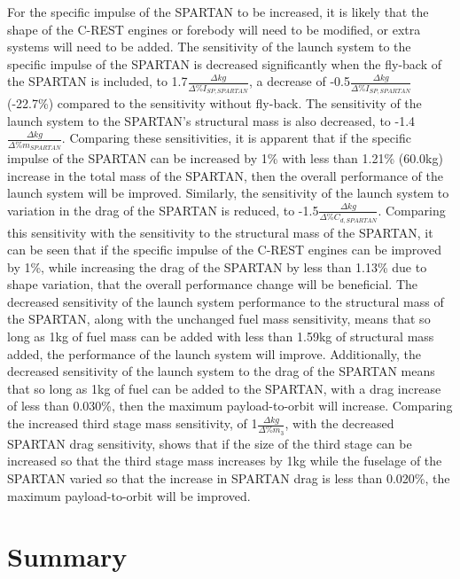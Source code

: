 For the specific impulse of the SPARTAN to be increased, it is likely that the shape of the C-REST engines or forebody will need to be modified, or extra systems will need to be added. 
 The sensitivity of the launch system to the specific impulse of the SPARTAN is decreased significantly when the fly-back of the SPARTAN is included, to 1.7$\frac{\Delta kg}{\Delta\%I_{SP,SPARTAN}}$, a decrease of -0.5$\frac{\Delta kg}{\Delta\%I_{SP,SPARTAN}}$ (-22.7\%) compared to the sensitivity without fly-back. The sensitivity of the launch system to the SPARTAN's structural mass is also decreased, to -1.4$\frac{\Delta kg}{\Delta\%m_{SPARTAN}}$. Comparing these sensitivities, it is apparent that if the specific impulse of the SPARTAN can be increased by 1\% with less than 1.21\% (60.0kg) increase in the total mass of the SPARTAN, then the overall performance of the launch system will be improved.  
Similarly, the sensitivity of the launch system to variation in the drag of the SPARTAN is reduced, to -1.5$\frac{\Delta kg}{\Delta\%C_{d,SPARTAN}}$. Comparing this sensitivity with the sensitivity to the structural mass of the SPARTAN, it can be seen that if the specific impulse of the C-REST engines can be improved by 1\%, while increasing the drag of the SPARTAN by less than 1.13\% due to shape variation, that the overall performance change will be beneficial. 
The decreased sensitivity of the launch system performance to the structural mass of the SPARTAN, along with the unchanged fuel mass sensitivity, means that so long as 1kg of fuel mass can be added with less than 1.59kg of structural mass added, the performance of the launch system will improve. Additionally, the decreased sensitivity of the launch system to the drag of the SPARTAN means that so long as 1kg of fuel can be added to the SPARTAN, with a drag increase of less than 0.030\%, then the maximum payload-to-orbit will increase. 
Comparing the increased third stage mass sensitivity, of 1$\frac{\Delta kg}{\Delta\%m_{3}}$, with the decreased SPARTAN drag sensitivity, shows that if the size of the third stage can be increased so that the third stage mass increases by 1kg while the fuselage of the SPARTAN varied so that the increase in SPARTAN drag is less than 0.020\%, the maximum payload-to-orbit will be improved. 





\section{Summary}

